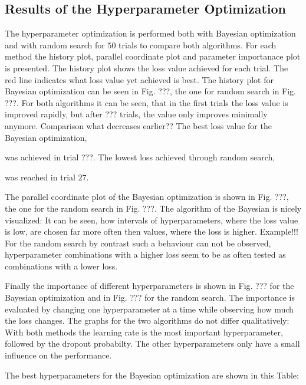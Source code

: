 \label{sec:results}

\subsection{Results of the Hyperparameter Optimization}
\label{subsec:perfmlp}

The hyperparameter optimization is performed both with Bayesian optimization and with random search for $50$ trials to compare both algorithms. For each method the history plot, 
parallel coordinate plot and parameter importanace plot is presented. The history plot shows the loss value achieved for each trial. The red line indicates what loss value yet achieved is best.
The history plot for Bayesian optimization can be seen in Fig. ???, the one for random search in Fig. ???. For both algorithms it can be seen, that in the first trials the loss value 
is improved rapidly, but after ??? trials, the value only improves minimally anymore. Comparison what decreases earlier??
The best loss value for the Bayesian optimization,


was achieved in trial ???. The lowest loss achieved through random search,


was reached in trial $27$. 

The parallel coordinate plot of the Bayesian optimization is shown in Fig. ???, the one for the random search in Fig. ???. The algorithm of the Bayesian is nicely visualized:
It can be seen, how intervals of hyperparameters, where the loss value is low, are chosen far more often then values, where the loss is higher. Example!!!
For the random search by contrast such a behaviour can not be observed, hyperparameter combinations with a higher loss seem to be as often tested as combinations with a lower loss.

Finally the importance of different hyperparameters is shown in Fig. ??? for the Bayesian optimization and in Fig. ??? for the random search. The importance is evaluated by changing one
hyperparameter at a time while observing how much the loss changes. The graphs for the two algorithms do not differ qualitatively: With both methods the learning rate is the most important
hyperparameter, followed by the dropout probabilty. The other hyperparameters only have a small influence on the performance.

The best hyperparameters for the Bayesian optimization are shown in this Table:

